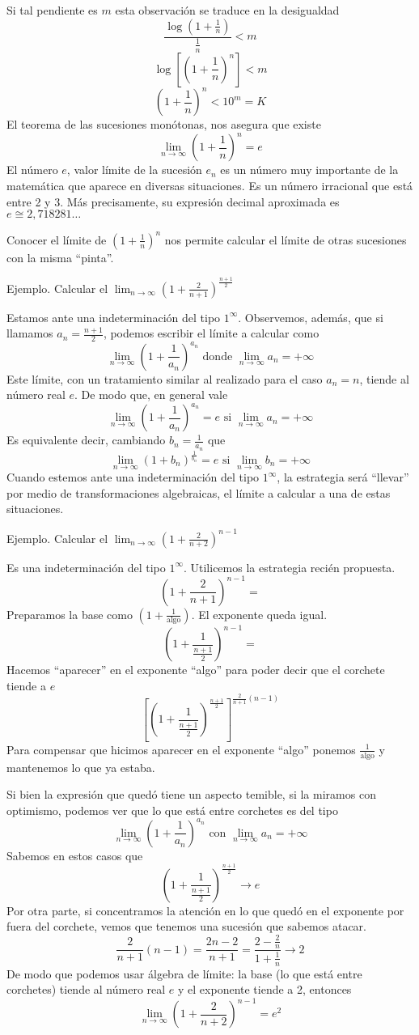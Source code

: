 \documentclass[../teoria.root.tex]{subfiles}
\begin{document}
Si tal pendiente es \(m\) esta observación se traduce en la desigualdad
\[\frac{\log\left(1+\frac{1}{n}\right)}{\frac{1}{n}}<m\]
\[\log\left[\left(1+\frac{1}{n}\right)^n\right]<m\]
\[\left(1+\frac{1}{n}\right)^n<10^m=K\]
El teorema de las sucesiones monótonas, nos asegura que existe \[\lim_{n\to\infty}\left(1+\frac{1}{n}\right)^n=e\]
El número \(e\), valor límite de la sucesión \(e_n\) es un número muy importante de la matemática que aparece en diversas situaciones.
Es un número irracional que está entre 2 y 3.
Más precisamente, su expresión decimal aproximada es \(e\cong2,718281\dots\)

Conocer el límite de \(\left(1+\frac{1}{n}\right)^n\) nos permite calcular el límite de otras sucesiones con la misma “pinta”.

Ejemplo.
Calcular el \(\lim_{n\to\infty}\left(1+\frac{2}{n+1}\right)^{\frac{n+1}{2}}\)

Estamos ante una indeterminación del tipo \(1^\infty\).
Observemos, además, que si llamamos \(a_n=\frac{n+1}{2}\), podemos escribir el límite a calcular como
\[\lim_{n\to\infty}\left(1+\frac{1}{a_n}\right)^{a_n}\text{ donde }\lim_{n\to\infty}a_n=+\infty\]
Este límite, con un tratamiento similar al realizado para el caso \(a_n=n\), tiende al número real \(e\).
De modo que, en general vale
\[\lim_{n\to\infty}\left(1+\frac{1}{a_n}\right)^{a_n}=e\text{ si }\lim_{n\to\infty}a_n=+\infty\]
Es equivalente decir, cambiando \(b_n=\frac{1}{a_n}\) que
\[\lim_{n\to\infty}\left(1+b_n\right)^{\frac{1}{b_n}}=e\text{ si }\lim_{n\to\infty}b_n=+\infty\]
Cuando estemos ante una indeterminación del tipo \(1^\infty\), la estrategia será “llevar” por medio de transformaciones algebraicas, el límite a calcular a una de estas situaciones.

Ejemplo.
Calcular el \(\lim_{n\to\infty}\left(1+\frac{2}{n+2}\right)^{n-1}\)

Es una indeterminación del tipo \(1^\infty\).
Utilicemos la estrategia recién propuesta.
\[\left(1+\frac{2}{n+1}\right)^{n-1}=\]
Preparamos la base como \(\left(1+\frac{1}{\text{algo}}\right)\).
El exponente queda igual.
\[\left(1+\frac{1}{\frac{n+1}{2}}\right)^{n-1}=\]
Hacemos ``aparecer'' en el exponente ``algo'' para poder decir que el corchete tiende a \(e\)
\[\left[\left(1+\frac{1}{\frac{n+1}{2}}\right)^{\frac{n+1}{2}}\right]^{\frac{2}{n+1}(n-1)}\]
Para compensar que hicimos aparecer en el exponente ``algo'' ponemos \(\frac{1}{\text{algo}}\) y mantenemos lo que ya estaba.

Si bien la expresión que quedó tiene un aspecto temible, si la miramos con optimismo, podemos ver que lo que está entre corchetes es del tipo
\[\lim_{n\to\infty}\left(1+\frac{1}{a_n}\right)^{a_n}\text{ con }\lim_{n\to\infty}a_n=+\infty\]
Sabemos en estos casos que
\[\left(1+\frac{1}{\frac{n+1}{2}}\right)^{\frac{n+1}{2}}\rightarrow e\]
Por otra parte, si concentramos la atención en lo que quedó en el exponente por fuera del corchete, vemos que tenemos una sucesión que sabemos atacar.
\[\frac{2}{n+1}(n-1)=\frac{2n-2}{n+1}=\frac{2-\frac{2}{n}}{1+\frac{1}{n}}\rightarrow2\]
De modo que podemos usar álgebra de límite:
la base (lo que está entre corchetes) tiende al número real \(e\) y el exponente tiende a 2, entonces
\[\lim_{n\to\infty}\left(1+\frac{2}{n+2}\right)^{n-1}=e^2\]
\end{document}
